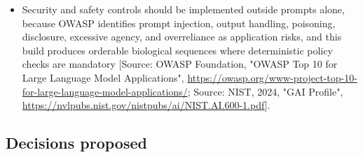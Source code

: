 \documentclass[11pt]{report}
\begin{document}
\begin{itemize}
\item Security and safety controls should be implemented outside prompts alone, because OWASP identifies prompt injection, output handling, poisoning, disclosure, excessive agency, and overreliance as application risks, and this build produces orderable biological sequences where deterministic policy checks are mandatory [Source: OWASP Foundation, "OWASP Top 10 for Large Language Model Applications", \url{https://owasp.org/www-project-top-10-for-large-language-model-applications/}; Source: NIST, 2024, "GAI Profile", \url{https://nvlpubs.nist.gov/nistpubs/ai/NIST.AI.600-1.pdf}].
\end{itemize}

\subsection{Decisions proposed}
\end{document}
